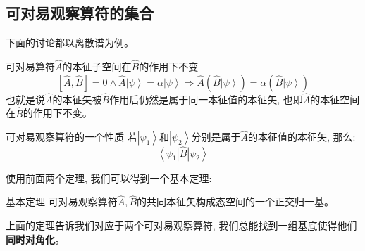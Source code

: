 \documentclass[a4paper,zihao=-4,linespread=1]{ctexrep}
\begin{document}
    \subsection*{可对易观察算符的集合}
    下面的讨论都以离散谱为例。
    \begin{theorem}{可对易算符$\hat{A}$的本征子空间在$\hat{B}$的作用下不变}
        \begin{equation*}
            \left [ \hat A,\hat B \right ] =0\land \hat{A}\left | \psi  \right \rangle =\alpha\left | \psi  \right \rangle \Rightarrow\hat{A}(\hat B\left | \psi  \right \rangle )=\alpha(\hat B\left | \psi  \right \rangle  )
        \end{equation*}
        也就是说$\hat{A}$的本征矢被$\hat{B}$作用后仍然是属于同一本征值的本征矢, 也即$\hat{A}$的本征空间在$\hat{B}$的作用下不变。
    \end{theorem}
    \begin{theorem}{可对易观察算符的一个性质}
        若$\left | \psi_1  \right \rangle  $和$\left | \psi_2  \right \rangle  $分别是属于$\hat{A}$的本征值的本征矢, 那么:
        \[\left\langle {{\psi _1}} \right|\hat B\left| {{\psi _2}} \right\rangle \]
    \end{theorem}
    使用前面两个定理, 我们可以得到一个基本定理:
    \begin{theorem}{基本定理}
        可对易观察算符$\hat A,\hat B $的共同本征矢构成态空间的一个正交归一基。
    \end{theorem}
    上面的定理告诉我们对应于两个可对易观察算符, 我们总能找到一组基底使得他们\textbf{同时对角化}。
\end{document}
